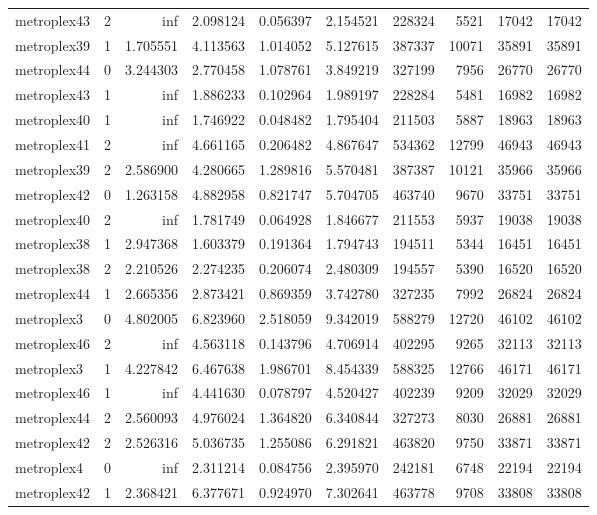 \begin{longtable}{|l|r|r|r|r|r|r|r|r|r|}
metroplex43 & 2 & inf & 2.098124 & 0.056397 & 2.154521 & 228324 & 5521 & 17042 & 17042 \\
metroplex39 & 1 & 1.705551 & 4.113563 & 1.014052 & 5.127615 & 387337 & 10071 & 35891 & 35891 \\
metroplex44 & 0 & 3.244303 & 2.770458 & 1.078761 & 3.849219 & 327199 & 7956 & 26770 & 26770 \\
metroplex43 & 1 & inf & 1.886233 & 0.102964 & 1.989197 & 228284 & 5481 & 16982 & 16982 \\
metroplex40 & 1 & inf & 1.746922 & 0.048482 & 1.795404 & 211503 & 5887 & 18963 & 18963 \\
metroplex41 & 2 & inf & 4.661165 & 0.206482 & 4.867647 & 534362 & 12799 & 46943 & 46943 \\
metroplex39 & 2 & 2.586900 & 4.280665 & 1.289816 & 5.570481 & 387387 & 10121 & 35966 & 35966 \\
metroplex42 & 0 & 1.263158 & 4.882958 & 0.821747 & 5.704705 & 463740 & 9670 & 33751 & 33751 \\
metroplex40 & 2 & inf & 1.781749 & 0.064928 & 1.846677 & 211553 & 5937 & 19038 & 19038 \\
metroplex38 & 1 & 2.947368 & 1.603379 & 0.191364 & 1.794743 & 194511 & 5344 & 16451 & 16451 \\
metroplex38 & 2 & 2.210526 & 2.274235 & 0.206074 & 2.480309 & 194557 & 5390 & 16520 & 16520 \\
metroplex44 & 1 & 2.665356 & 2.873421 & 0.869359 & 3.742780 & 327235 & 7992 & 26824 & 26824 \\
metroplex3 & 0 & 4.802005 & 6.823960 & 2.518059 & 9.342019 & 588279 & 12720 & 46102 & 46102 \\
metroplex46 & 2 & inf & 4.563118 & 0.143796 & 4.706914 & 402295 & 9265 & 32113 & 32113 \\
metroplex3 & 1 & 4.227842 & 6.467638 & 1.986701 & 8.454339 & 588325 & 12766 & 46171 & 46171 \\
metroplex46 & 1 & inf & 4.441630 & 0.078797 & 4.520427 & 402239 & 9209 & 32029 & 32029 \\
metroplex44 & 2 & 2.560093 & 4.976024 & 1.364820 & 6.340844 & 327273 & 8030 & 26881 & 26881 \\
metroplex42 & 2 & 2.526316 & 5.036735 & 1.255086 & 6.291821 & 463820 & 9750 & 33871 & 33871 \\
metroplex4 & 0 & inf & 2.311214 & 0.084756 & 2.395970 & 242181 & 6748 & 22194 & 22194 \\
metroplex42 & 1 & 2.368421 & 6.377671 & 0.924970 & 7.302641 & 463778 & 9708 & 33808 & 33808 \\

\end{longtable}
